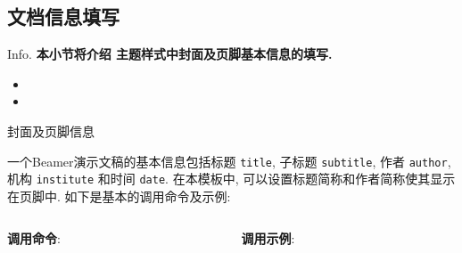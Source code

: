 \subsection{文档信息填写}
\begin{frame}{Info.}
	\textbf{本小节将介绍  主题样式中封面及页脚基本信息的填写.}
	\begin{multicols}{2}
		\begin{itemize}
			\item {}
			\item {}
		\end{itemize}
	\end{multicols}
	\mycopyright
\end{frame}

\begin{frame}{封面及页脚信息}

  一个Beamer演示文稿的基本信息包括标题 \alert{\texttt{title}}, 子标题 \alert{\texttt{subtitle}}, 作者 \alert{\texttt{author}}, 机构 \alert{\texttt{institute}} 和时间 \alert{\texttt{date}}. 在本模板中, 可以设置\alert{标题简称}和\alert{作者简称}使其显示在页脚中. 如下是基本的调用命令及示例: 

  \begin{columns}[T, onlytextwidth]%
		\begin{column}{.5\textwidth}
			\textbf{调用命令}:\\
			\\
      \\
      \\
      \\
		\end{column}
		\begin{column}{.5\textwidth}
			\textbf{调用示例}:\\
			\\
      \\
      \\
      \\
		\end{column}
	\end{columns}


\end{frame}
